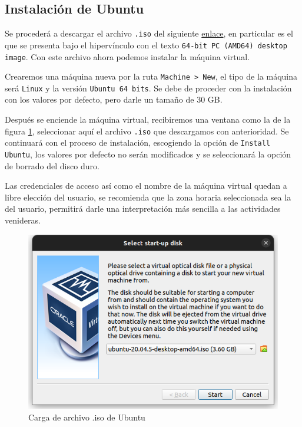 \documentclass{article}
\begin{document}
        \subsection{Instalación de Ubuntu}

            Se procederá a descargar el archivo \texttt{.iso} del siguiente \href{https://releases.ubuntu.com/focal/}{enlace}, en particular es el que se presenta bajo el hipervínculo con el texto \texttt{64-bit PC (AMD64) desktop image}. Con este archivo ahora podemos instalar la máquina virtual.

            Crearemos una máquina nueva por la ruta \texttt{Machine > New}, el tipo de la máquina será \texttt{Linux} y la versión \texttt{Ubuntu 64 bits}. Se debe de proceder con la instalación con los valores por defecto, pero darle un tamaño de 30 GB.

            Después se enciende la máquina virtual, recibiremos una ventana como la de la figura \ref{fig:ubuntu-iso-load}, seleccionar aquí el archivo \texttt{.iso} que descargamos con anterioridad. Se continuará con el proceso de instalación, escogiendo la opción de \texttt{Install Ubuntu}, los valores por defecto no serán modificados y se seleccionará la opción de borrado del disco duro.

            Las credenciales de acceso así como el nombre de la máquina virtual quedan a libre elección del usuario, se recomienda que la zona horaria seleccionada sea la del usuario, permitirá darle una interpretación más sencilla a las actividades venideras.
            \begin{figure}[!htbp]
                \centering
                \includegraphics[scale=0.3]{img/ubuntu-install.png}
                \caption{Carga de archivo .iso de Ubuntu}
                \label{fig:ubuntu-iso-load}
            \end{figure}
\end{document}
